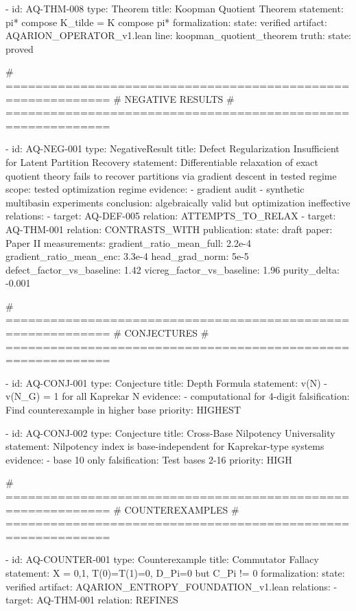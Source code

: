{{{{{{{{{{{{{  - id: AQ-THM-008
    type: Theorem
    title: Koopman Quotient Theorem
    statement: pi* compose K_tilde = K compose pi*
    formalization:
      state: verified
      artifact: AQARION_OPERATOR_v1.lean
      line: koopman_quotient_theorem
    truth:
      state: proved

  # ============================================================
  # NEGATIVE RESULTS
  # ============================================================

  - id: AQ-NEG-001
    type: NegativeResult
    title: Defect Regularization Insufficient for Latent Partition Recovery
    statement: Differentiable relaxation of exact quotient theory fails to recover partitions via gradient descent in tested regime
    scope: tested optimization regime
    evidence:
      - gradient audit
      - synthetic multibasin experiments
    conclusion: algebraically valid but optimization ineffective
    relations:
      - target: AQ-DEF-005
        relation: ATTEMPTS_TO_RELAX
      - target: AQ-THM-001
        relation: CONTRASTS_WITH
    publication:
      state: draft
      paper: Paper II
    measurements:
      gradient_ratio_mean_full: 2.2e-4
      gradient_ratio_mean_enc: 3.3e-4
      head_grad_norm: 5e-5
      defect_factor_vs_baseline: 1.42
      vicreg_factor_vs_baseline: 1.96
      purity_delta: -0.001

  # ============================================================
  # CONJECTURES
  # ============================================================

  - id: AQ-CONJ-001
    type: Conjecture
    title: Depth Formula
    statement: v(N) - v(N_G) = 1 for all Kaprekar N
    evidence:
      - computational for 4-digit
    falsification: Find counterexample in higher base
    priority: HIGHEST

  - id: AQ-CONJ-002
    type: Conjecture
    title: Cross-Base Nilpotency Universality
    statement: Nilpotency index is base-independent for Kaprekar-type systems
    evidence:
      - base 10 only
    falsification: Test bases 2-16
    priority: HIGH

  # ============================================================
  # COUNTEREXAMPLES
  # ============================================================

  - id: AQ-COUNTER-001
    type: Counterexample
    title: Commutator Fallacy
    statement: X = {0,1}, T(0)=T(1)=0, D_Pi=0 but C_Pi != 0
    formalization:
      state: verified
      artifact: AQARION_ENTROPY_FOUNDATION_v1.lean
    relations:
      - target: AQ-THM-001
        relation: REFINES

}}}}}}}}}}}}}
